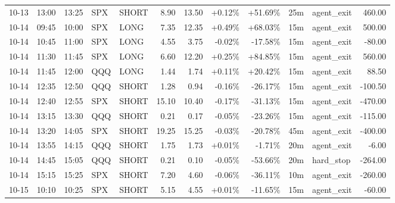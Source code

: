\documentclass[11pt,a4paper]{article}
\begin{document}
\begin{center}
\begin{longtable}{>{\color{txtmain}}l l l l l r r r r r >{\color{txtmain}}l r}
10-13 & 13:00 & 13:25 & SPX & SHORT & 8.90 & 13.50 & \textcolor{wingreen}{+0.12\%} & \textcolor{wingreen}{+51.69\%} & 25m & agent\_exit & \textcolor{wingreen}{460.00} \\
10-14 & 09:45 & 10:00 & SPX & LONG & 7.35 & 12.35 & \textcolor{wingreen}{+0.49\%} & \textcolor{wingreen}{+68.03\%} & 15m & agent\_exit & \textcolor{wingreen}{500.00} \\
10-14 & 10:45 & 11:00 & SPX & LONG & 4.55 & 3.75 & \textcolor{lossred}{-0.02\%} & \textcolor{lossred}{-17.58\%} & 15m & agent\_exit & \textcolor{lossred}{-80.00} \\
10-14 & 11:30 & 11:45 & SPX & LONG & 6.60 & 12.20 & \textcolor{wingreen}{+0.25\%} & \textcolor{wingreen}{+84.85\%} & 15m & agent\_exit & \textcolor{wingreen}{560.00} \\
10-14 & 11:45 & 12:00 & QQQ & LONG & 1.44 & 1.74 & \textcolor{wingreen}{+0.11\%} & \textcolor{wingreen}{+20.42\%} & 15m & agent\_exit & \textcolor{wingreen}{88.50} \\
10-14 & 12:35 & 12:50 & QQQ & SHORT & 1.28 & 0.94 & \textcolor{lossred}{-0.16\%} & \textcolor{lossred}{-26.17\%} & 15m & agent\_exit & \textcolor{lossred}{-100.50} \\
10-14 & 12:40 & 12:55 & SPX & SHORT & 15.10 & 10.40 & \textcolor{lossred}{-0.17\%} & \textcolor{lossred}{-31.13\%} & 15m & agent\_exit & \textcolor{lossred}{-470.00} \\
10-14 & 13:15 & 13:30 & QQQ & SHORT & 0.21 & 0.17 & \textcolor{lossred}{-0.05\%} & \textcolor{lossred}{-23.26\%} & 15m & agent\_exit & \textcolor{lossred}{-115.00} \\
10-14 & 13:20 & 14:05 & SPX & SHORT & 19.25 & 15.25 & \textcolor{lossred}{-0.03\%} & \textcolor{lossred}{-20.78\%} & 45m & agent\_exit & \textcolor{lossred}{-400.00} \\
10-14 & 13:55 & 14:15 & QQQ & SHORT & 1.75 & 1.73 & \textcolor{wingreen}{+0.01\%} & \textcolor{lossred}{-1.71\%} & 20m & agent\_exit & \textcolor{lossred}{-6.00} \\
10-14 & 14:45 & 15:05 & QQQ & SHORT & 0.21 & 0.10 & \textcolor{lossred}{-0.05\%} & \textcolor{lossred}{-53.66\%} & 20m & hard\_stop & \textcolor{lossred}{-264.00} \\
10-14 & 15:15 & 15:25 & SPX & SHORT & 7.20 & 4.60 & \textcolor{lossred}{-0.06\%} & \textcolor{lossred}{-36.11\%} & 10m & agent\_exit & \textcolor{lossred}{-260.00} \\
10-15 & 10:10 & 10:25 & SPX & SHORT & 5.15 & 4.55 & \textcolor{wingreen}{+0.01\%} & \textcolor{lossred}{-11.65\%} & 15m & agent\_exit & \textcolor{lossred}{-60.00} \\

\end{longtable}
\end{center}
\end{document}
